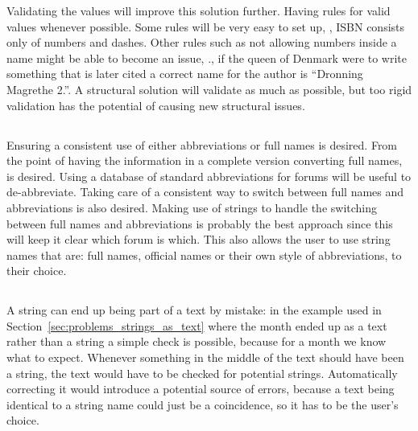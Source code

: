 Validating the values will improve this solution further.  Having
rules for valid values whenever possible.  Some rules will be very
easy to set up, \eg, ISBN consists only of numbers and dashes.  Other
rules such as not allowing numbers inside a name might be able to
become an issue, \eg., if the queen of Denmark were to write something
that is later cited a correct name for the author is ``Dronning
Magrethe 2.''.  A structural solution will validate as much as
possible, but too rigid validation has the potential of causing new
structural issues.


\subsection{}

Ensuring a consistent use of either abbreviations or full names is
desired.  From the point of having the information in a complete
version converting full names,  is desired.
Using a database of standard abbreviations for forums will be useful
to de-abbreviate.  Taking care of a consistent way to switch between
full names and abbreviations is also desired.  Making use of strings
to handle the switching between full names and abbreviations is
probably the best approach since this will keep it clear which forum
is which.  This also allows the user to use string names that are:
full names, official names or their own style of abbreviations, to
their choice.


\subsection{}

A {\bibtex} string can end up being part of a text by mistake: in the
example used in Section~\ref{sec:problems_strings_as_text} where the
month ended up as a text rather than a string a simple check is
possible, because for a month we know what to expect.  Whenever
something in the middle of the text should have been a string, the
text would have to be checked for potential strings.  Automatically
correcting it would introduce a potential source of errors, because a
text being identical to a string name could just be a coincidence, so
it has to be the user's choice.


\subsection{}

